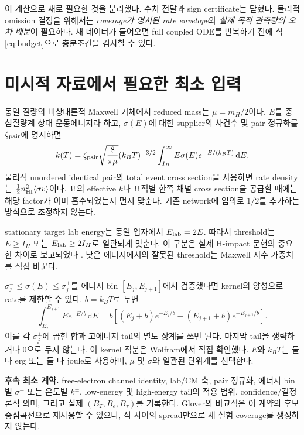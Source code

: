 \documentclass[11pt,a4paper]{article}
\newcommand{\dd}{\mathrm d}\newcommand{\HH}{\mathrm{HH}}\newcommand{\eV}{\mathrm{eV}}
\begin{document}
이 계산으로 새로 필요한 것을 분리했다. 수치 전달과 sign certificate는 닫혔다. 물리적 omission 결정을 위해서는 \emph{coverage가 명시된 rate envelope}와 \emph{실제 목적 관측량의 오차 배분}이 필요하다. 새 데이터가 들어오면 full coupled ODE를 반복하기 전에 식 \eqref{eq:budget}으로 충분조건을 검사할 수 있다.

\newpage
\section{미시적 자료에서 필요한 최소 입력}
\label{sec:microscopic}
동일 질량의 비상대론적 Maxwell 기체에서 reduced mass는 $\mu=m_H/2$이다. $E$를 중심질량계 상대 운동에너지라 하고, $\sigma(E)$에 대한 supplier의 사건수 및 pair 정규화를 $\zeta_{\rm pair}$에 명시하면
\begin{equation}
k(T)=\zeta_{\rm pair}\sqrt{\frac{8}{\pi\mu}}(k_BT)^{-3/2}
\int_{I_H}^{\infty}E\sigma(E)e^{-E/(k_BT)}\,\dd E.
\end{equation}
물리적 unordered identical pair의 total event cross section을 사용하면 rate density는 $\frac12n_{\rm HI}^2\langle\sigma v\rangle$이다. 표의 effective $k$나 표적별 한쪽 채널 cross section을 공급할 때에는 해당 factor가 이미 흡수되었는지 먼저 맞춘다. 기존 network에 임의로 $1/2$를 추가하는 방식으로 조정하지 않는다.

stationary target lab energy는 동일 입자에서 $E_{\rm lab}=2E$. 따라서 threshold는 $E\ge I_H$ 또는 $E_{\rm lab}\ge2I_H$로 일관되게 맞춘다. 이 구분은 실제 H-impact 문헌의 중요한 차이로 보고되었다 \cite{barklem}. 낮은 에너지에서의 잘못된 threshold는 Maxwell 지수 가중치를 직접 바꾼다.

$\sigma_j^-\le\sigma(E)\le\sigma_j^+$를 에너지 bin $[E_j,E_{j+1}]$에서 검증했다면 kernel의 양성으로 rate를 제한할 수 있다. $b=k_BT$로 두면
\begin{equation}
\int_{E_j}^{E_{j+1}}E e^{-E/b}\,\dd E
=b\left[(E_j+b)e^{-E_j/b}-(E_{j+1}+b)e^{-E_{j+1}/b}\right].
\end{equation}
이를 각 $\sigma_j^{\pm}$에 곱한 합과 고에너지 tail의 별도 상계를 쓰면 된다. 마지막 tail을 생략하거나 0으로 두지 않는다. 이 kernel 적분은 Wolfram에서 직접 확인했다. $E$와 $k_BT$는 둘 다 erg 또는 둘 다 joule로 사용하며, $\mu$ 및 $\sigma$와 일관된 단위계를 선택한다.

\textbf{후속 최소 계약.} free-electron channel identity, lab/CM 축, pair 정규화, 에너지 bin별 $\sigma^\pm$ 또는 온도별 $k^\pm$, low-energy 및 high-energy tail의 적용 범위, confidence/결정론적 의미, 그리고 실제 $(B_T,B_e,B_\tau)$를 기록한다. Glover의 비교식은 이 계약의 후보 중심곡선으로 재사용할 수 있으나, 식 사이의 spread만으로 새 실험 coverage를 생성하지 않는다.
\end{document}

